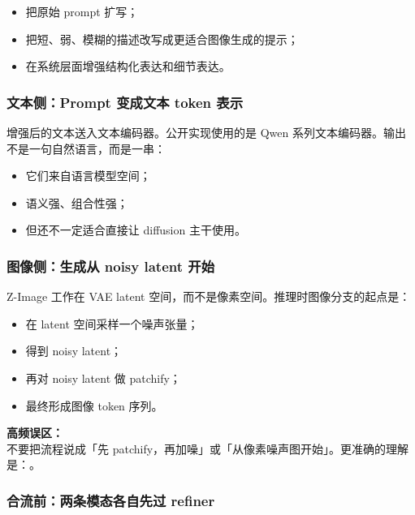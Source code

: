\begin{itemize}[leftmargin=1.5em]
  \item 把原始 prompt 扩写；
  \item 把短、弱、模糊的描述改写成更适合图像生成的提示；
  \item 在系统层面增强结构化表达和细节表达。
\end{itemize}

\subsubsection{文本侧：Prompt 变成文本 token 表示}

增强后的文本送入文本编码器。公开实现使用的是 Qwen 系列文本编码器。输出不是一句自然语言，而是一串：

\begin{itemize}[leftmargin=1.5em]
  \item 它们来自语言模型空间；
  \item 语义强、组合性强；
  \item 但还不一定适合直接让 diffusion 主干使用。
\end{itemize}

\subsubsection{图像侧：生成从 noisy latent 开始}

Z-Image 工作在 VAE latent 空间，而不是像素空间。推理时图像分支的起点是：

\begin{itemize}[leftmargin=1.5em]
  \item 在 latent 空间采样一个噪声张量；
  \item 得到 noisy latent；
  \item 再对 noisy latent 做 patchify；
  \item 最终形成图像 token 序列。
\end{itemize}

\begin{warnbox}
\textbf{高频误区：}\\
不要把流程说成「先 patchify，再加噪」或「从像素噪声图开始」。更准确的理解是：。
\end{warnbox}

\subsubsection{合流前：两条模态各自先过 refiner}

